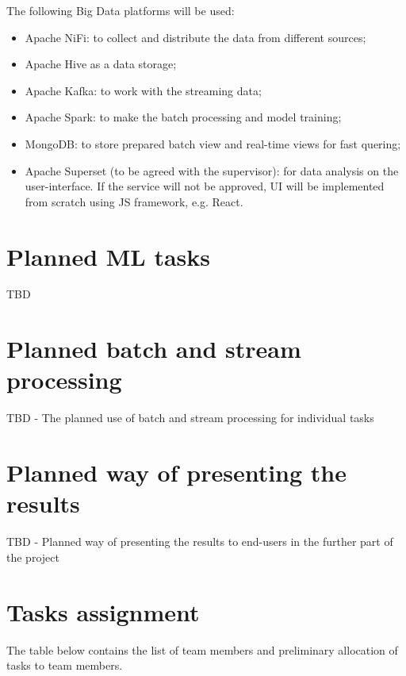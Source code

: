 \documentclass[12pt,a4paper, hidelinks]{article}
\begin{document}
The following Big Data platforms will be used:
\begin{itemize}
    \item Apache NiFi: to collect and distribute the data from different sources;
    \item Apache Hive as a data storage;
    \item Apache Kafka: to work with the streaming data;
    \item Apache Spark: to make the batch processing and model training;
    \item MongoDB: to store prepared batch view and real-time views for fast quering;
    \item Apache Superset (to be agreed with the supervisor): for data analysis on the user-interface. If the service will not be approved, UI will be implemented from scratch using JS framework, e.g. React.
\end{itemize}

\section{Planned ML tasks}

TBD

\section{Planned batch and stream processing}

TBD - The planned use of batch and stream processing for individual tasks

\section{Planned way of presenting the results}

TBD - Planned way of presenting the results to end-users in the further part of the project


\newpage

\section{Tasks assignment}

The table below contains the list of team members and preliminary allocation of tasks to team members.
\end{document}
